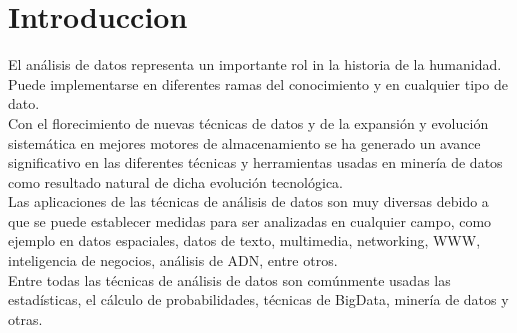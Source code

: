 \section{Introduccion}
 El análisis de datos representa un importante rol in la historia de la humanidad. Puede implementarse en diferentes ramas del conocimiento y en cualquier tipo de dato.\\
 Con el florecimiento de nuevas técnicas de datos y de la expansión y evolución sistemática en mejores motores de almacenamiento se ha generado un avance significativo en las diferentes técnicas y herramientas usadas en minería de datos como resultado natural de dicha evolución tecnológica.\\
 Las aplicaciones de las técnicas de análisis de datos son muy diversas debido a que se puede establecer medidas para ser analizadas en cualquier campo, como ejemplo en datos espaciales, datos de texto, multimedia, networking, WWW, inteligencia de negocios, análisis de ADN, entre otros.\\
 Entre todas las técnicas de análisis de datos son comúnmente usadas las estadísticas, el cálculo de probabilidades, técnicas de BigData, minería de datos y otras.
